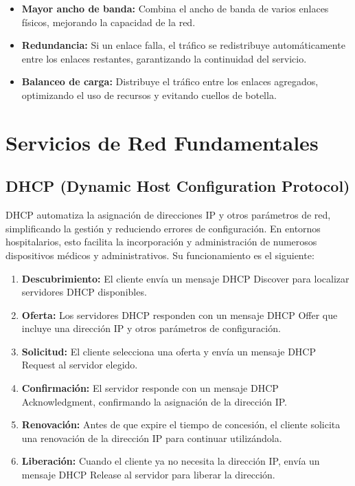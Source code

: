 \begin{itemize}
    \item \textbf{Mayor ancho de banda:} Combina el ancho de banda de varios enlaces físicos, mejorando la capacidad de la red.
    \item \textbf{Redundancia:} Si un enlace falla, el tráfico se redistribuye automáticamente entre los enlaces restantes, garantizando la continuidad del servicio.
    \item \textbf{Balanceo de carga:} Distribuye el tráfico entre los enlaces agregados, optimizando el uso de recursos y evitando cuellos de botella.
\end{itemize}

\section{Servicios de Red Fundamentales}
\subsection{DHCP (Dynamic Host Configuration Protocol)}
\label{subsec:dhcp}
\acs{DHCP} automatiza la asignación de direcciones \acs{IP} y otros parámetros de red, simplificando la gestión y reduciendo errores de configuración. En entornos hospitalarios, esto facilita la 
incorporación y administración de numerosos dispositivos médicos y administrativos. Su funcionamiento es el siguiente:
\begin{enumerate}
    \item \textbf{Descubrimiento:} El cliente envía un mensaje \acs{DHCP} Discover para localizar servidores \acs{DHCP} disponibles.
    \item \textbf{Oferta:} Los servidores \acs{DHCP} responden con un mensaje \acs{DHCP} Offer que incluye una dirección \acs{IP} y otros parámetros de configuración.
    \item \textbf{Solicitud:} El cliente selecciona una oferta y envía un mensaje \acs{DHCP} Request al servidor elegido.
    \item \textbf{Confirmación:} El servidor responde con un mensaje \acs{DHCP} Acknowledgment, confirmando la asignación de la dirección \acs{IP}.
    \item \textbf{Renovación:} Antes de que expire el tiempo de concesión, el cliente solicita una renovación de la dirección \acs{IP} para continuar utilizándola.
    \item \textbf{Liberación:} Cuando el cliente ya no necesita la dirección \acs{IP}, envía un mensaje \acs{DHCP} Release al servidor para liberar la dirección.
\end{enumerate}

